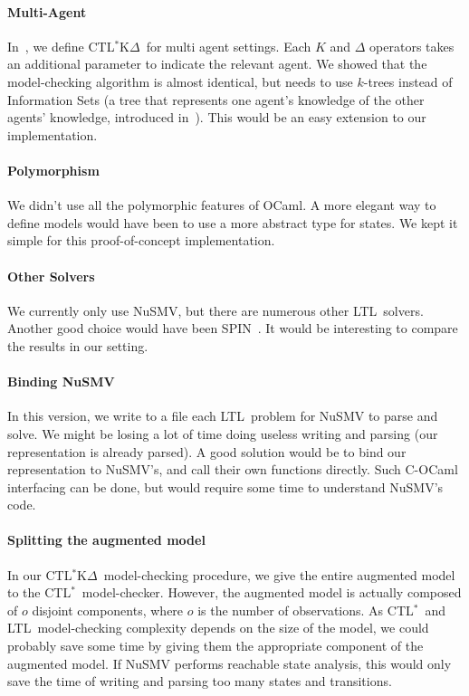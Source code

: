 \documentclass[dvipsnames]{acmart}
\def\ctls{CTL$^{*}$}
\def\ctlskd{CTL$^{*}$K$\Delta$}
\def\ltl{LTL}
\def\K{\mathit{K}}
\begin{document}
\paragraph{Multi-Agent}
In~\cite{KR18}, we define \ctlskd\ for multi agent settings. Each $\K$ and $\Delta$ operators takes an additional parameter to indicate the relevant agent.
We showed that the model-checking algorithm is almost identical, but needs to use $k$-trees instead of Information Sets (a tree that represents one agent's knowledge of the other agents' knowledge, introduced in~\cite{ktrees}).
This would be an easy extension to our implementation.

\paragraph{Polymorphism}
We didn't use all the polymorphic features of OCaml. A more elegant way to define models would have been to use a more abstract type for states. We kept it simple for this proof-of-concept implementation.

\paragraph{Other Solvers}
We currently only use NuSMV, but there are numerous other \ltl\ solvers. Another good choice would have been SPIN~\cite{spin}.
It would be interesting to compare the results in our setting.

\paragraph{Binding NuSMV}
In this version, we write to a file each \ltl\ problem for NuSMV to parse and solve. We might be losing a lot of time doing useless writing and parsing (our representation is already parsed). A good solution would be to bind our representation to NuSMV's, and call their own functions directly. Such C-OCaml interfacing can be done, but would require some time to understand NuSMV's code.

\paragraph{Splitting the augmented model}
In our \ctlskd\ model-checking procedure, we give the entire augmented model to the \ctls\ model-checker.
However, the augmented model is actually composed of $o$ disjoint components, where $o$ is the number of observations.
As \ctls\ and \ltl\ model-checking complexity depends on the size of the model, we could probably save some time by giving them the appropriate component of the augmented model. If NuSMV performs reachable state analysis, this would only save the time of writing and parsing too many states and transitions.
\end{document}
